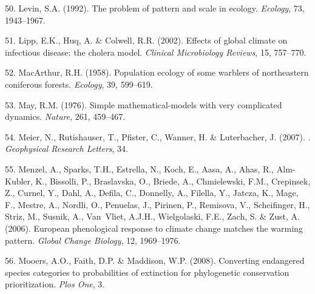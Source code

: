 \documentclass[11pt,a4paper,oneside]{article}
\begin{document}
\begin{thebibliography}{79}
50. Levin, S.A. (1992).
\newblock The problem of pattern and scale in ecology.
\newblock \emph{Ecology}, 73, 1943--1967.

51. Lipp, E.K., Huq, A. \& Colwell, R.R. (2002).
\newblock Effects of global climate on infectious disease: the cholera model.
\newblock \emph{Clinical Microbiology Reviews}, 15, 757--770.

52. MacArthur, R.H. ({1958}).
\newblock Population ecology of some warblers of northeastern coniferous
  forests.
\newblock \emph{Ecology}, {39}, {599--619}.

53. May, R.M. (1976).
\newblock Simple mathematical-models with very complicated dynamics.
\newblock \emph{Nature}, 261, 459--467.

54. Meier, N., Rutishauser, T., Pfister, C., Wanner, H. \& Luterbacher, J. (2007).
.
\newblock \emph{Geophysical Research Letters}, 34.

55. Menzel, A., Sparks, T.H., Estrella, N., Koch, E., Aasa, A., Ahas, R.,
  Alm-Kubler, K., Bissolli, P., Braslavska, O., Briede, A., Chmielewski, F.M.,
  Crepinsek, Z., Curnel, Y., Dahl, A., Defila, C., Donnelly, A., Filella, Y.,
  Jatcza, K., Mage, F., Mestre, A., Nordli, O., Penuelas, J., Pirinen, P.,
  Remisova, V., Scheifinger, H., Striz, M., Susnik, A., Van~Vliet, A.J.H.,
  Wielgolaski, F.E., Zach, S. \& Zust, A. (2006).
\newblock European phenological response to climate change matches the warming
  pattern.
\newblock \emph{Global Change Biology}, 12, 1969--1976.

56. Mooers, A.O., Faith, D.P. \& Maddison, W.P. (2008).
\newblock Converting endangered species categories to probabilities of
  extinction for phylogenetic conservation prioritization.
\newblock \emph{Plos One}, 3.


\end{thebibliography}
\end{document}
